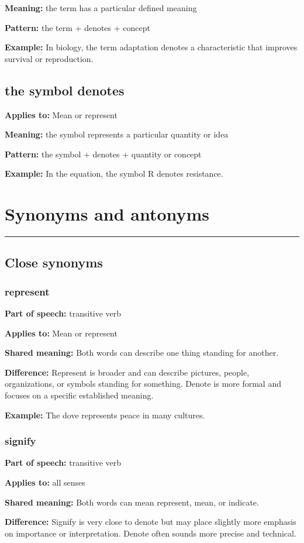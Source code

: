 \documentclass[11pt]{article}
\newcommand{\sectionrule}{\par\vspace{-0.5em}\noindent\textcolor{Accent}{\rule{\linewidth}{0.6pt}}\par}
\begin{document}
\textbf{Meaning:} the term has a particular defined meaning

\textbf{Pattern:} the term + denotes + concept

\textbf{Example:} In biology, the term adaptation denotes a characteristic that improves survival or reproduction.

\subsection{the symbol denotes}
\textbf{Applies to:} Mean or represent

\textbf{Meaning:} the symbol represents a particular quantity or idea

\textbf{Pattern:} the symbol + denotes + quantity or concept

\textbf{Example:} In the equation, the symbol R denotes resistance.

\section{Synonyms and antonyms}
\sectionrule
\subsection{Close synonyms}
\subsubsection{represent}
\textbf{Part of speech:} transitive verb

\textbf{Applies to:} Mean or represent

\textbf{Shared meaning:} Both words can describe one thing standing for another.

\textbf{Difference:} Represent is broader and can describe pictures, people, organizations, or symbols standing for something. Denote is more formal and focuses on a specific established meaning.

\textbf{Example:} The dove represents peace in many cultures.

\subsubsection{signify}
\textbf{Part of speech:} transitive verb

\textbf{Applies to:} all senses

\textbf{Shared meaning:} Both words can mean represent, mean, or indicate.

\textbf{Difference:} Signify is very close to denote but may place slightly more emphasis on importance or interpretation. Denote often sounds more precise and technical.
\end{document}
